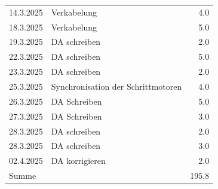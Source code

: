 \begin{longtable}{|l|p{10cm}|r|}
    14.3.2025	&	Verkabelung     &	4.0\\
    18.3.2025	&	Verkabelung	&	5.0\\
    19.3.2025   &   DA schreiben    &   2.0 \\
    22.3.2025   &   DA schreiben    &   5.0 \\
    23.3.2025   &   DA schreiben    &   2.0 \\
    25.3.2025	&	Synchronisation der Schrittmotoren	&	4.0\\
    26.3.2025   &   DA Schreiben    &   5.0 \\
    27.3.2025   &   DA Schreiben    &   3.0 \\
    28.3.2025	&	DA schreiben	&	2.0\\
    28.3.2025	&	DA schreiben	&	3.0\\
    02.4.2025   &   DA korrigieren  &   2.0\\
    \hline
    \hline
    Summe       &                   &   195,8\\

\end{longtable}
\newpage

